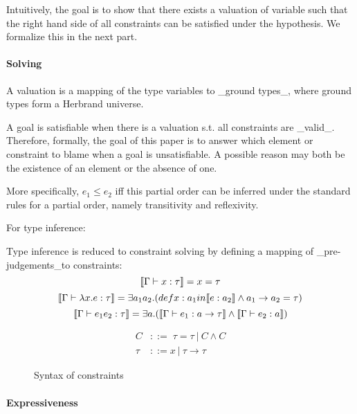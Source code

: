 Intuitively, the goal is to show that there exists a valuation of
variable such that the right hand side of all constraints can be
satisfied under the hypothesis. We formalize this in the next part.


\paragraph{Solving}

A valuation is a mapping of the type variables to _ground types_,
where ground types form a Herbrand universe.

A goal is satisfiable when there is a valuation s.t. all constraints
are _valid_. Therefore, formally, the goal of this paper is to answer
which element or constraint to blame when a goal is unsatisfiable. A
possible reason may both be the existence of an element or the absence
of one. 

More specifically, $e_1\leq e_2$ iff this partial order can be
inferred under the standard rules for a partial order, namely
transitivity and reflexivity. 

For type inference:

Type inference is reduced to constraint solving by defining a mapping
of _pre-judgements_to constraints:
\[\llbracket \Gamma \vdash x:\tau \rrbracket = x =\tau\]
\[\llbracket \Gamma \vdash \lambda x.e:\tau \rrbracket = \exists a_1 a_2.
(def x: a_1 in \llbracket e:a_2 \rrbracket \land a_1 \rightarrow a_2 =\tau)\]
\[\llbracket \Gamma\vdash e_1 e_2 : \tau \rrbracket = \exists a.(\llbracket \Gamma \vdash
e_1:a\rightarrow \tau \rrbracket\land \llbracket \Gamma\vdash e_2:a \rrbracket)\]


\begin{figure}[b]
\begin{align*}
C &::=\; \tau = \tau\ |\ C \land C \\
\tau &::= x\ |\ \tau\rightarrow \tau
\end{align*}
\caption{Syntax of constraints}
\label{figure:cons:syntax}
\end{figure}

\paragraph{Expressiveness}

